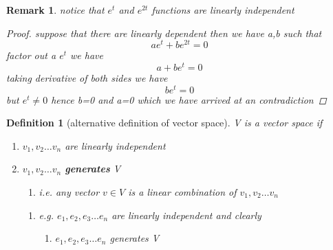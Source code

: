 \documentclass{article}
\newtheorem*{definition}{Definition}
\newtheorem*{remark}{Remark}
\newcommand{\vs}{v_1,v_2\dots v_n}
\begin{document}
\begin{remark}
    notice that $e^t $ and $e^{2t}$ functions are linearly independent
    \begin{proof}
        suppose that there are linearly dependent then we have a,b such that \\
    $$    ae^t+be^{2t}=0$$
    factor out a $e^t$ we have 
    $$a+be^t=0$$taking derivative of both sides we have
$$be^t=0$$
but $e^t \not =0$ hence b=0 and a=0 which we have arrived at an contradiction  \lightning
    \end{proof}
\end{remark}

\begin{definition}[alternative definition of vector space]
V is a vector space if 
\begin{enumerate}
    \item $\vs $ are linearly independent
    \item $\vs$ \textbf{\textit{generates}} V
    \begin{enumerate}
        \item i.e. any vector $v \in V $ is a linear combination of $\vs$
    \end{enumerate}
    \begin{enumerate}
        \item e.g. $e_1,e_2,e_3\dots e_n$ are linearly independent and clearly
        \begin{enumerate}
            \item $e_1,e_2,e_3\dots e_n$ generates V
        \end{enumerate}
    \end{enumerate}
\end{enumerate}
\end{definition}
\end{document}
